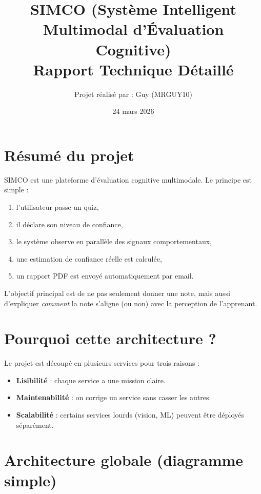 \documentclass[12pt,a4paper]{article}
\title{\textbf{SIMCO (Syst\`eme Intelligent Multimodal d'\'Evaluation Cognitive)\\Rapport Technique D\'etaill\'e}}
\author{Projet r\'ealis\'e par : Guy (MRGUY10)}
\date{24 mars 2026}
\begin{document}
\maketitle
\tableofcontents
\newpage

\section{R\'esum\'e du projet}
SIMCO est une plateforme d'\'evaluation cognitive multimodale. Le principe est simple :
\begin{enumerate}
    \item l'utilisateur passe un quiz,
    \item il d\'eclare son niveau de confiance,
    \item le syst\`eme observe en parall\`ele des signaux comportementaux,
    \item une estimation de \og confiance r\'eelle \fg{} est calcul\'ee,
    \item un rapport PDF est envoy\'e automatiquement par email.
\end{enumerate}

L'objectif principal est de ne pas seulement donner une note, mais aussi d'expliquer \emph{comment} la note s'aligne (ou non) avec la perception de l'apprenant.

\section{Pourquoi cette architecture ?}
Le projet est d\'ecoup\'e en plusieurs services pour trois raisons :
\begin{itemize}
    \item \textbf{Lisibilit\'e} : chaque service a une mission claire.
    \item \textbf{Maintenabilit\'e} : on corrige un service sans casser les autres.
    \item \textbf{Scalabilit\'e} : certains services lourds (vision, ML) peuvent \^etre d\'eploy\'es s\'epar\'ement.
\end{itemize}

\section{Architecture globale (diagramme simple)}
\end{document}
